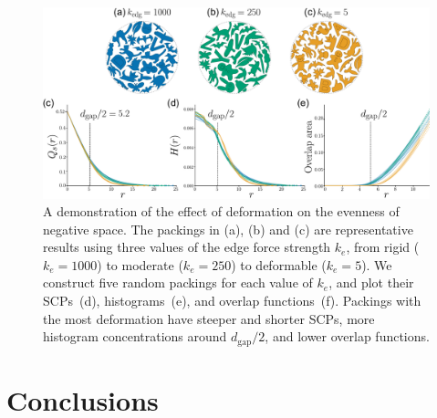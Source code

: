 \begin{figure}[t]
\centering
\includegraphics[width=1.0\textwidth]{figures/metrics/evaluation.pdf}
\caption[A demonstration of the effect of deformation \newline on the evenness of negative space]
{\label{fifteen_packings}
    A demonstration of the effect of deformation on the evenness of negative space.  
    The packings in (a), (b) and (c) are representative results using three values of the edge force strength $k_e$,
    from 
	rigid ($k_e=1000$) to moderate ($k_e=250$) to deformable ($k_e=5$).
	We construct
    five random packings for each value of $k_e$, and plot their SCPs~(d), histograms~(e), and overlap functions~(f).
    Packings with the most deformation have steeper and shorter SCPs, 
    more histogram concentrations around $d_\mathrm{gap} / 2$, and lower overlap functions.
}
\end{figure}







\section{Conclusions}


